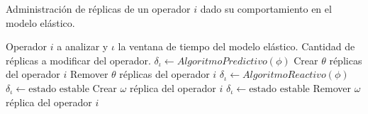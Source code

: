 \begin{algorithm}[!ht]
	\caption{Administración de réplicas de un operador $i$ dado su comportamiento en el modelo elástico.}
	\label{alg:administracion}
	\begin{algorithmic}[1]
	\REQUIRE Operador $i$ a analizar y $\iota$ la ventana de tiempo del modelo elástico.
	\ENSURE Cantidad de réplicas a modificar del operador.	
		\STATE $\delta_{\iota} \leftarrow AlgoritmoPredictivo(\phi)$
				\RETURN Crear $\theta$ réplicas del operador $i$
			\ENDIF
			\RETURN Remover $\theta$ réplicas del operador $i$
		\ENDIF
	\ELSE[$\iota$ es $T_r$]
		\STATE $\delta_{\iota} \leftarrow AlgoritmoReactivo(\phi)$
				\STATE $\delta_{\iota} \leftarrow \text{estado estable}$ 
				\RETURN Crear $\omega$ réplica del operador $i$
			\ENDIF
			\STATE $\delta_{\iota} \leftarrow \text{estado estable}$ 
			\RETURN Remover $\omega$ réplica del operador $i$
		\ENDIF 
	\ENDIF	
	\end{algorithmic}
\end{algorithm}